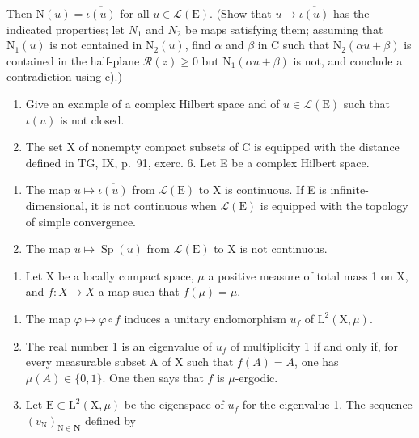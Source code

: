   Then \(\mathrm{N}(u)=\overline{\iota(u)}\) for all \(u\in\mathcal{L}(\mathrm{E})\). (Show that \(u\mapsto\overline{\iota(u)}\) has the indicated properties; let \(N_{1}\) and \(N_{2}\) be maps satisfying them; assuming that \(\mathrm{N}_{1}(u)\) is not contained in \(\mathrm{N}_{2}(u)\), find \(\alpha\) and \(\beta\) in C such that \(\mathrm{N}_{2}(\alpha u+\beta)\) is contained in the half-plane \(\mathcal{R}(z)\geqslant0\) but \(\mathrm{N}_{1}(\alpha u+\beta)\) is not, and conclude a contradiction using c).)

\begin{enumerate}
\def\labelenumi{\arabic{enumi})}
\setcounter{enumi}{13}
\item
  Give an example of a complex Hilbert space and of \(u \in \mathcal{L}(\mathrm{E})\) such that \(\iota(u)\) is not closed.
\item
  The set X of nonempty compact subsets of C is equipped with the distance defined in TG, IX, p.~91, exerc. 6. Let E be a complex Hilbert space.
\end{enumerate}

\begin{enumerate}
\def\labelenumi{\alph{enumi})}
\item
  The map \(u \mapsto \overline{\iota(u)}\) from \(\mathcal{L}(\mathrm{E})\) to X is continuous. If E is infinite-dimensional, it is not continuous when \(\mathcal{L}(\mathrm{E})\) is equipped with the topology of simple convergence.
\item
  The map \(u \mapsto \operatorname{Sp}(u)\) from \(\mathcal{L}(\mathrm{E})\) to X is not continuous.
\end{enumerate}

\begin{enumerate}
\def\labelenumi{\arabic{enumi})}
\setcounter{enumi}{15}
\tightlist
\item
  Let X be a locally compact space, \(\mu\) a positive measure of total mass 1 on X, and \(f: X \to X\) a map such that \(f(\mu) = \mu\).
\end{enumerate}

\begin{enumerate}
\def\labelenumi{\alph{enumi})}
\item
  The map \(\varphi \mapsto \varphi \circ f\) induces a unitary endomorphism \(u_{f}\) of \(\mathrm{L}^2 (\mathrm{X},\mu)\).
\item
  The real number 1 is an eigenvalue of \(u_f\) of multiplicity 1 if and only if, for every measurable subset A of X such that \(f(A) = A\), one has \(\mu(A) \in \{0,1\}\). One then says that \(f\) is \(\mu\)-ergodic.
\item
  Let \(\mathrm{E}\subset\mathrm{L}^{2}(\mathrm{X},\mu)\) be the eigenspace of \(u_{f}\) for the eigenvalue 1. The sequence \((v_{\mathrm{N}})_{\mathrm{N}\in\mathbf{N}}\) defined by
\end{enumerate}

